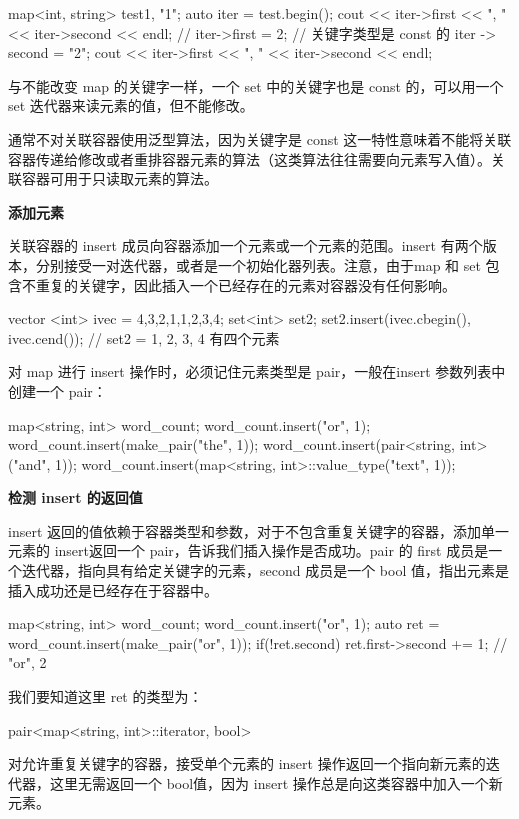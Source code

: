 \begin{enumerate}
\begin{Code}
map<int, string> test{{1, "1"}};
auto iter = test.begin();
cout << iter->first << ", " << iter->second << endl;
// iter->first = 2;         // 关键字类型是 const 的
iter -> second = "2";
cout << iter->first << ", " << iter->second << endl;
\end{Code}

与不能改变 map 的关键字一样，一个 set 中的关键字也是 const 的，可以用一个 set 迭代器来读元素的值，但不能修改。

通常不对关联容器使用泛型算法，因为关键字是 const 这一特性意味着不能将关联容器传递给修改或者重排容器元素的算法（这类算法往往需要向元素写入值）。关联容器可用于只读取元素的算法。

\subitem \textbf{添加元素}

关联容器的 insert 成员向容器添加一个元素或一个元素的范围。insert 有两个版本，分别接受一对迭代器，或者是一个初始化器列表。注意，由于map 和 set 包含不重复的关键字，因此插入一个已经存在的元素对容器没有任何影响。
\begin{Code}
vector <int> ivec = {4,3,2,1,1,2,3,4};
set<int> set2;
set2.insert(ivec.cbegin(), ivec.cend());
// set2 = {1, 2, 3, 4} 有四个元素
\end{Code}
对 map 进行 insert 操作时，必须记住元素类型是 pair，一般在insert 参数列表中创建一个 pair：
\begin{Code}
map<string, int> word_count;
word_count.insert({"or", 1});
word_count.insert(make_pair("the", 1));
word_count.insert(pair<string, int>("and", 1));
word_count.insert(map<string, int>::value_type("text", 1));
\end{Code}
\subitem \textbf{检测 insert 的返回值}

insert 返回的值依赖于容器类型和参数，对于不包含重复关键字的容器，添加单一元素的 insert返回一个 pair，告诉我们插入操作是否成功。pair 的 first 成员是一个迭代器，指向具有给定关键字的元素，second 成员是一个 bool 值，指出元素是插入成功还是已经存在于容器中。
\begin{Code}
map<string, int> word_count;
word_count.insert({"or", 1});
auto ret = word_count.insert(make_pair("or", 1));
if(!ret.second){
	ret.first->second += 1;
}
// {"or", 2}
\end{Code}
我们要知道这里 ret 的类型为：
\begin{Code}
pair<map<string, int>::iterator, bool> 
\end{Code}
对允许重复关键字的容器，接受单个元素的 insert 操作返回一个指向新元素的迭代器，这里无需返回一个 bool值，因为 insert 操作总是向这类容器中加入一个新元素。


\end{enumerate}
